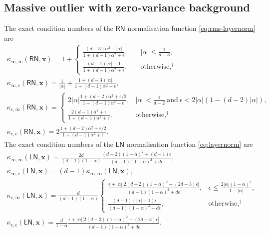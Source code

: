 \documentclass[namedate,webpdf,imanum]{ima-authoring-template}
\newcommand{\Matrix}[1]{\mathbf{#1}}
\newcommand{\Layer}[1]{\mathsf{#1}}
\newcommand{\cond}[3][]{\kappa_{\mathrm{#2}} #1( #3 #1)}
\numberwithin{equation}{section}
\begin{document}
\subsection{Massive outlier with zero-variance background}
The exact condition numbers of the $\Layer{RN}$ normalisation function \eqref{eq:rms-layernorm} are
\begin{gather*}
    \cond{\infty, \infty}{\Layer{RN}, \Matrix{x}} = 1 + \begin{cases}
        \frac{(d-3) \alpha^2 + |\alpha|}{1 + (d-1) \alpha^2 + \epsilon}, \quad & |\alpha| \leq \tfrac{1}{d-3}, \\
        \frac{(d-1) |\alpha| - 1}{1 + (d-1) \alpha^2 + \epsilon}, \quad & \text{otherwise},^\dagger
    \end{cases}\\
    \cond{\infty,c}{\Layer{RN},\Matrix{x}} = \frac{1}{|\alpha|} + \frac{1 + (d-3) |\alpha|}{1 + (d-1) \alpha^2 + \epsilon}, \\
    \cond{c,\infty}{\Layer{RN},\Matrix{x}} = \begin{cases}
        2 |\alpha| \frac{1 + (d-2) \alpha^2 + \epsilon/2}{1 + (d-1) \alpha^2 + \epsilon}, & |\alpha| < \frac{1}{d-2}~\text{and}~\epsilon < 2 |\alpha| (1 - (d-2) |\alpha|), \\
        \frac{2(d-1) \alpha^2 + \epsilon}{1 + (d-1) \alpha^2 + \epsilon}, & \text{otherwise},^\dagger
    \end{cases}\\
    \cond{c,c}{\Layer{RN}, \Matrix{x}} = 2 \frac{1 + (d-2) \alpha^2 + \epsilon/2}{1 + (d-1) \alpha^2 + \epsilon}.
\end{gather*}
The exact condition numbers of the $\Layer{LN}$ normalisation function \eqref{eq:layernorm} are
\begin{gather*}
    \cond{\infty,\infty}{\Layer{LN}, \Matrix{x}} = \frac{2d}{(d-1)(1-\alpha)} \frac{(d-2)(1-\alpha)^2 + (d-1)\epsilon}{(d-1)(1-\alpha)^2 + d\epsilon}, \\
    \cond{\infty,c}{\Layer{LN}, \Matrix{x}} = (d-1) \cond{\infty,\infty}{\Layer{LN}, \Matrix{x}}, \\
    \cond{c,\infty}{\Layer{LN}, \Matrix{x}} = \frac{d}{(d-1)(1-\alpha)} \begin{cases}
        \frac{\epsilon + |\alpha| \big[ 2(d-2)(1-\alpha)^2 + (2d-3) \epsilon \big]}{(d-1)(1-\alpha)^2 + d\epsilon}, & \epsilon \leq \frac{2 |\alpha| (1 - \alpha)^2}{1 - |\alpha|}, \\
        \frac{(d-1) (|\alpha| + 1) \epsilon}{(d-1)(1-\alpha)^2 + d\epsilon}, & \text{otherwise},^\dagger
    \end{cases} \\
    \cond{c,c}{\Layer{LN}, \Matrix{x}} = \frac{d}{1-\alpha} \frac{\epsilon + |\alpha| \big[ 2(d-2)(1-\alpha)^2 + (2d-3) \epsilon \big]}{(d-1)(1-\alpha)^2 + d\epsilon}.
\end{gather*}
\end{document}

